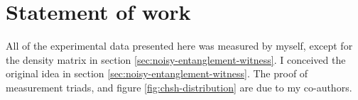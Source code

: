 \section*{Statement of work}
All of the experimental data presented here was measured by myself, except for the density matrix in section \ref{sec:noisy-entanglement-witness}. I conceived the original idea in  section \ref{sec:noisy-entanglement-witness}. The proof of measurement triads, and figure \ref{fig:chsh-distribution} are due to my co-authors.




